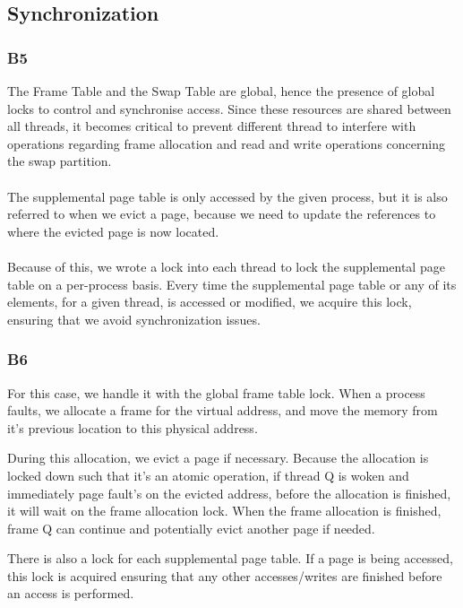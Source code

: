\documentclass[a4wide, 11pt]{article}
\begin{document}
\subsection{Synchronization}
\subsubsection{B5}

The Frame Table and the Swap Table are global, hence the presence of global locks to control and synchronise access. Since these resources are shared between all threads, it becomes critical to prevent different thread to interfere with operations regarding frame allocation and read and write operations concerning the swap partition.\\
\\
The supplemental page table is only accessed by the given process, but it is also referred to when we evict a page, because we need to update the references to where the evicted page is now located.\\
\\
Because of this, we wrote a lock into each thread to lock the supplemental page table on a per-process basis. Every time the supplemental page table or any of its elements, for a given thread, is accessed or modified, we acquire this lock, ensuring that we avoid synchronization issues.




\subsubsection{B6}

For this case, we handle it with the global frame table lock. When a process faults, we allocate a frame for the virtual address, and move the memory from it's previous location to this physical address.

During this allocation, we evict a page if necessary. Because the allocation is locked down such that it's an atomic operation, if thread Q is woken and immediately page fault's on the evicted address, before the allocation is finished, it will wait on the frame allocation lock. When the frame allocation is finished, frame Q can continue and potentially evict another page if needed.

There is also a lock for each supplemental page table. If a page is being accessed, this lock is acquired ensuring that any other accesses/writes are finished before an access is performed.
\end{document}
